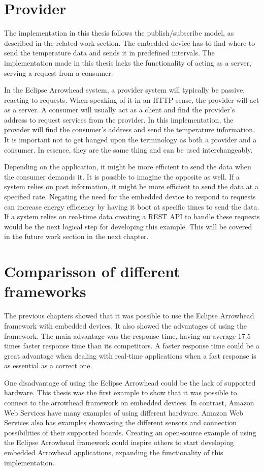 \section{Provider}
The implementation in this thesis follows the publish/subscribe model, as described in the related work section. 
The embedded device has to find where to send the temperature data and sends it in predefined intervals. 
The implementation made in this thesis lacks the functionality of acting as a server, serving a request from a consumer. 

In the Eclipse Arrowhead system, a provider system will typically be passive, reacting to requests.
When speaking of it in an HTTP sense, the provider will act as a server.
A consumer will usually act as a client and find the provider's address to request services from the provider. 
In this implementation, the provider will find the consumer's address and send the temperature information.
It is important not to get hanged upon the terminology as both a provider and a consumer. 
In essence, they are the same thing and can be used interchangeably.

Depending on the application, it might be more efficient to send the data when the consumer demands it. 
It is possible to imagine the opposite as well.
If a system relies on past information, it might be more efficient to send the data at a specified rate.
Negating the need for the embedded device to respond to requests can increase energy efficiency by having it boot at specific times to send the data.
If a system relies on real-time data creating a REST API to handle these requests would be the next logical step for developing this example. 
This will be covered in the future work section in the next chapter.

\section{Comparisson of different frameworks}
The previous chapters showed that it was possible to use the Eclipse Arrowhead framework with embedded devices. It also showed the advantages of using the framework.
The main advantage was the response time, having on average 17.5 times faster response time than its competitors. 
A faster response time could be a great advantage when dealing with real-time applications when a fast response is as essential as a correct one. 

One disadvantage of using the Eclipse Arrowhead could be the lack of supported hardware.
This thesis was the first example to show that it was possible to connect to the arrowhead framework on embedded devices.
In contrast, Amazon Web Services have many examples of using different hardware. 
Amazon Web Services also has examples showcasing the different sensors and connection possibilities of their supported boards.
Creating an open-source example of using the Eclipse Arrowhead framework could inspire others to start developing embedded Arrowhead applications, expanding the functionality of this implementation.

